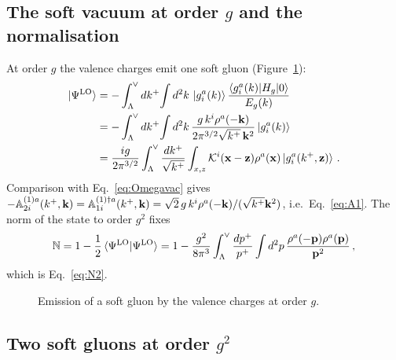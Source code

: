 \subsection{The soft vacuum at order \texorpdfstring{$g$}{g} and the normalisation}

At order $g$ the valence charges emit one soft gluon (Figure~\ref{fig:vac_g}):
\begin{align}\label{eq:PsiLO}
\ket{\Psi^{\rm LO}}&=-\int_\Lambda^\vee dk^+\!\int d^2k\,\ket{g^a_i(k)}\frac{\braket{g^a_i(k)|H_g|0}}{E_g(k)}
\notag\\&=-\int_\Lambda^\vee dk^+\!\int d^2k\,\frac{g\,k^i\rho^a(-\mathbf{k})}{2\pi^{3/2}\sqrt{k^+}\,\mathbf{k}^2}\ket{g^a_i(k)}
\notag\\&=\frac{ig}{2\pi^{3/2}}\int_\Lambda^\vee\frac{dk^+}{\sqrt{k^+}}\int_{x,z}\mathcal{K}^i(\mathbf{x}-\mathbf{z})\rho^a(\mathbf{x})\ket{g^a_i(k^+,\mathbf{z})}\,.
\end{align}
Comparison with Eq.~\eqref{eq:Omegavac} gives $-\mathbb{A}^{(1)a}_{2i}(k^+,\mathbf{k})=\mathbb{A}^{(1)\dagger a}_{1i}(k^+,\mathbf{k})=\sqrt2\,g\,k^i\rho^a(-\mathbf{k})/(\sqrt{k^+}\mathbf{k}^2)$, i.e.\ Eq.~\eqref{eq:A1}. The norm of the state to order $g^2$ fixes
\begin{align}
\mathbb{N}=1-\frac12\braket{\Psi^{\rm LO}|\Psi^{\rm LO}}=1-\frac{g^2}{8\pi^3}\int_\Lambda^\vee\frac{dp^+}{p^+}\int d^2p\,\frac{\rho^a(-\mathbf{p})\rho^a(\mathbf{p})}{\mathbf{p}^2}\,,
\end{align}
which is Eq.~\eqref{eq:N2}.

\begin{figure}[t]
\centering
{}
\caption{Emission of a soft gluon by the valence charges at order $g$.}
\label{fig:vac_g}
\end{figure}

\subsection{Two soft gluons at order \texorpdfstring{$g^2$}{g2}}

